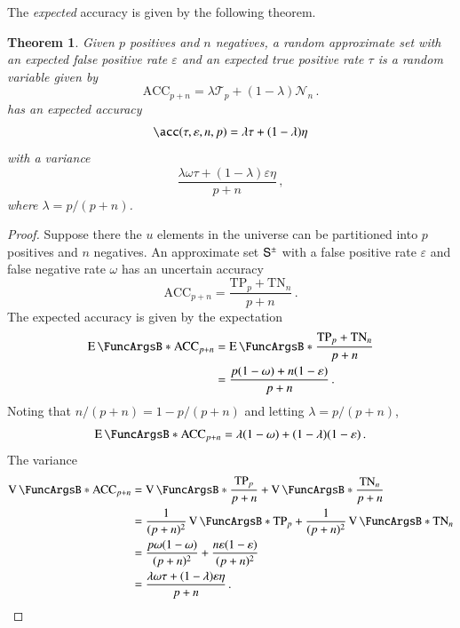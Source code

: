 \documentclass[10pt,final,hidelinks]{article}
\numberwithin{equation}{section}
\newcommand{\p}{p}
\newcommand{\n}{n}
\newcommand{\ACC}{\RV{ACC}}
\newcommand{\TNR}{\mathcal{N}}
\newcommand{\TPR}{\mathcal{T}}
\newcommand{\TP}{\RV{TP}}
\newcommand{\TN}{\RV{TN}}
\newcommand{\tprate}{\tau}
\newcommand{\fprate}{\varepsilon}
\newcommand{\fnrate}{\omega}
\newcommand{\tnrate}{\eta}
\newcommand{\RV}[1]{\mathrm{#1}}
\newcommand{\envnumstyle}{chapter}
\renewcommand{\envnumstyle}{chapter}
\renewcommand{\envnumstyle}{section}
\theoremstyle{plain}
\newtheorem{theorem}{Theorem}[\envnumstyle]
\begin{document}
The \emph{expected} accuracy is given by the following theorem.
\begin{theorem}
	\label{thm:approx_expected_accuracy}
	Given $\p$ positives and $\n$ negatives, a random approximate set with an 
	\emph{expected} false positive rate $\fprate$ and an \emph{expected} true 
	positive rate $\tprate$ is a random variable given by
	\begin{equation}
	\ACC_{\p + \n} = \lambda \TPR_\p + (1 - \lambda) \TNR_\n\,.
	\end{equation}	
	has an \emph{expected} accuracy
	\begin{equation}
	\label{eq:approx_expected_accuracy}
	\acc(\tprate,\fprate,\n,\p) = \lambda \tprate + (1-\lambda) \tnrate
	\end{equation}
	with a variance
	\begin{equation}
	\frac{\lambda \fnrate \tprate + (1 - \lambda)\fprate 
		\tnrate}{\p+\n}\,,   
	\end{equation}
	where $\lambda = \p / (\p + \n)$.
\end{theorem}
\begin{proof}
	Suppose there the $u$ elements in the universe can be partitioned into $\p$ 
	positives and $\n$ negatives. An approximate set $\ASet{S}$ with a false 
	positive rate $\fprate$ and false negative rate $\fnrate$ has an uncertain 
	accuracy
	\begin{equation}
	\ACC_{\p + \n} = \frac{\TP_\p + \TN_\n}{\p + \n}\,.
	\end{equation}
	The expected accuracy is given by the expectation
	\begin{align}
	\Expect{\ACC_{\p + \n}}
	&= \Expect{\frac{\TP_\p + \TN_\n}{\p + \n}}\\
	&= \frac{\p (1 - \fnrate) + \n (1 - \fprate)}{\p + \n}\,.
	\end{align}
	Noting that $\n/(\p+\n) = 1 - \p/(\p+\n)$ and letting $\lambda = \p/(\p + 
	\n)$,
	\begin{equation}
	\Expect{\ACC_{\p + \n}} = \lambda (1 - \fnrate) + (1 - \lambda) (1 - 
	\fprate)\,.
	\end{equation}
	The variance
	\begin{align}
	\Var{\ACC_{\p + \n}}
	&= \Var{\frac{\TP_\p}{\p + \n}} + \Var{\frac{\TN_\n}{\p + \n}}\\
	&= \frac{1}{(\p + \n)^2}\Var{\TP_\p} + \frac{1}{(\p + \n)^2}\Var{\TN_\n}\\
	&= \frac{\p \fnrate (1 - \fnrate)}{(\p + \n)^2} + \frac{\n \fprate (1 - 
		\fprate)}{(\p + \n)^2}\\
	&= \frac{\lambda \fnrate \tprate + (1 - \lambda)\fprate 
		\tnrate}{\p+\n}\,.
	\end{align}
\end{proof}
\end{document}
